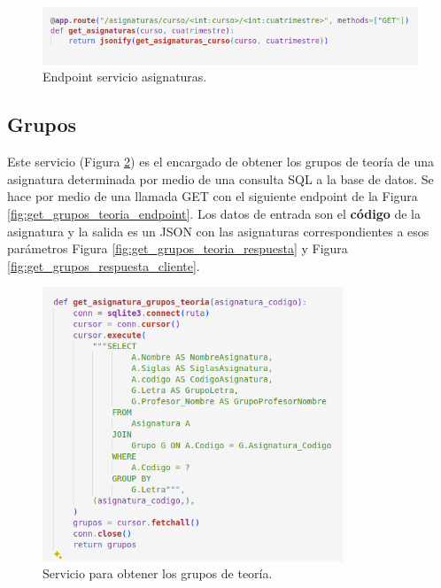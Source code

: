 \begin{figure}[H]
    \centering
    \includegraphics[width=1\textwidth]{./imagenes/get_asignaturas_endpoint.png}
    \caption{Endpoint servicio asignaturas.}
    \label{fig:get_asignaturas_endpoint}
\end{figure}

\subsection*{Grupos}

Este servicio (Figura \ref{fig:get_grupos_teoria}) es el encargado de obtener los grupos de teoría de una asignatura determinada por medio de una consulta SQL a la base de datos. Se hace por medio de una llamada GET con el siguiente endpoint de la Figura \ref{fig:get_grupos_teoria_endpoint}. Los datos de entrada son el \textbf{código} de la asignatura y la salida es un JSON con las asignaturas correspondientes a esos parámetros Figura \ref{fig:get_grupos_teoria_respuesta} y Figura \ref{fig:get_grupos_respuesta_cliente}.

\begin{figure}[H]
    \centering
    \includegraphics[width=0.8\textwidth]{./imagenes/get_grupos_teoria.png}
    \caption{Servicio para obtener los grupos de teoría.}
    \label{fig:get_grupos_teoria}
\end{figure}

